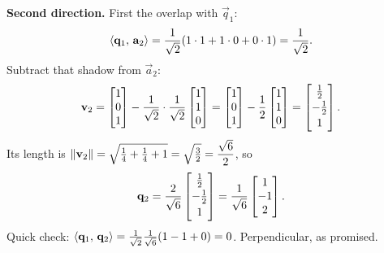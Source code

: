 \textbf{Second direction.} First the overlap with $\vec{q}_1$:
\[
  \langle \mathbf{q}_1,\, \mathbf{a}_2 \rangle
   = \frac{1}{\sqrt2}(1\cdot 1 + 1\cdot 0 + 0\cdot 1) = \frac{1}{\sqrt2}.
\]
Subtract that shadow from $\vec{a}_2$:
\[
  \mathbf{v}_2
   = \begin{bmatrix}1\\0\\1\end{bmatrix} - \frac{1}{\sqrt2}\cdot\frac{1}{\sqrt2}\begin{bmatrix}1\\1\\0\end{bmatrix}
   = \begin{bmatrix}1\\0\\1\end{bmatrix} - \frac12\begin{bmatrix}1\\1\\0\end{bmatrix}
   = \begin{bmatrix}\tfrac12\\[2pt]-\tfrac12\\[2pt]1\end{bmatrix}.
\]
Its length is $\lVert\mathbf{v}_2\rVert=\sqrt{\tfrac14+\tfrac14+1}=\sqrt{\tfrac32}=\dfrac{\sqrt6}{2}$, so
\[
  \mathbf{q}_2 = \frac{2}{\sqrt6}\begin{bmatrix}\tfrac12\\[2pt]-\tfrac12\\[2pt]1\end{bmatrix}
            = \frac{1}{\sqrt6}\begin{bmatrix}1\\-1\\2\end{bmatrix}.
\]
Quick check: $\langle \mathbf{q}_1,\, \mathbf{q}_2 \rangle=\frac{1}{\sqrt2}\frac{1}{\sqrt6}(1-1+0)=0$.
Perpendicular, as promised.


